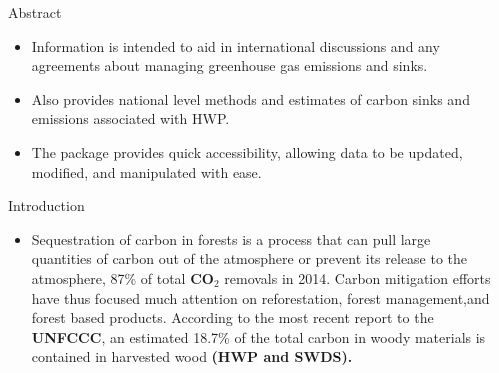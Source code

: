 \documentclass[final]{beamer}\usepackage[]{graphicx}\usepackage[]{color}
\newlength{\sepwid}
\newlength{\onecolwid}
\begin{document}
\begin{frame}[t]
\begin{columns}[t]
\begin{column}{\sepwid}\end{column} %

\begin{column}{\onecolwid} %



\begin{alertblock}{Abstract}
\begin{itemize}
\item Information is intended to aid in international discussions and any agreements about managing greenhouse gas emissions and sinks.
\item Also provides national level methods and estimates of carbon sinks and emissions associated with HWP.
\item The package provides quick accessibility, allowing data to be updated, modified, and manipulated with ease.
\end{itemize}
\vspace{0ex}

\end{alertblock}


\begin{alertblock}{Introduction}
\begin{itemize}

\item Sequestration of carbon in forests is a process that can pull large quantities of carbon out of the atmosphere or prevent its release to the atmosphere, 87\% of total \textbf{CO$_{2}$} removals in 2014. Carbon mitigation efforts have thus focused much attention on reforestation, forest management,and forest based products. According to the most recent report to the \textbf{UNFCCC}, an estimated 18.7\% of the total carbon in woody materials is contained in harvested wood \textbf{(HWP and SWDS).}  



\end{itemize}
\end{alertblock}
\end{column}
\end{columns}
\end{frame}
\end{document}
